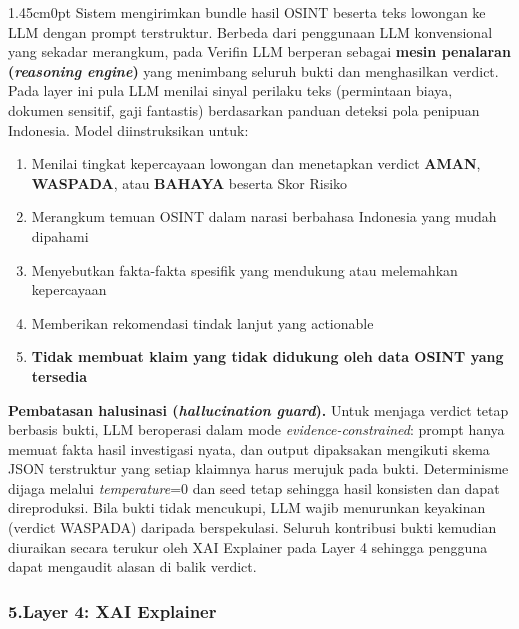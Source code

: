\documentclass[12pt,a4paper]{article}
\begin{document}
\begin{adjustwidth}{1.45cm}{0pt}
\hspace*{0.85cm}Sistem mengirimkan bundle hasil OSINT beserta teks lowongan ke LLM
dengan prompt terstruktur. Berbeda dari penggunaan LLM konvensional yang sekadar merangkum, pada
Verifin LLM berperan sebagai \textbf{mesin penalaran (\textit{reasoning engine})} yang menimbang
seluruh bukti dan menghasilkan verdict. Pada layer ini pula LLM menilai sinyal perilaku teks
(permintaan biaya, dokumen sensitif, gaji fantastis) berdasarkan panduan deteksi pola penipuan
Indonesia. Model diinstruksikan untuk:
\begin{enumerate}[label=\textbf{\alph*.}, labelindent=0pt, leftmargin=*]
\item Menilai tingkat kepercayaan lowongan dan menetapkan verdict \textbf{AMAN}, \textbf{WASPADA}, atau \textbf{BAHAYA} beserta Skor Risiko
\item Merangkum temuan OSINT dalam narasi berbahasa Indonesia yang mudah dipahami
\item Menyebutkan fakta-fakta spesifik yang mendukung atau melemahkan kepercayaan
\item Memberikan rekomendasi tindak lanjut yang actionable
\item \textbf{Tidak membuat klaim yang tidak didukung oleh data OSINT yang tersedia}
\end{enumerate}

\textbf{Pembatasan halusinasi (\textit{hallucination guard}).} Untuk menjaga verdict tetap berbasis bukti, LLM beroperasi dalam mode
\textit{evidence-constrained}: prompt hanya memuat fakta hasil investigasi nyata, dan output
dipaksakan mengikuti skema JSON terstruktur yang setiap klaimnya harus merujuk pada bukti.
Determinisme dijaga melalui \textit{temperature}=0 dan seed tetap sehingga hasil konsisten dan
dapat direproduksi. Bila bukti tidak mencukupi, LLM wajib menurunkan keyakinan (verdict WASPADA)
daripada berspekulasi. Seluruh kontribusi bukti kemudian diuraikan secara terukur oleh XAI
Explainer pada Layer 4 sehingga pengguna dapat mengaudit alasan di balik verdict.
\end{adjustwidth}

\subsubsection*{5.\quad Layer 4: XAI Explainer}
\end{document}
